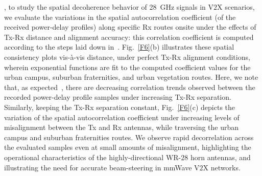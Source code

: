 \documentclass[10pt, twocolumn]{IEEEtran}
\begin{document}
, to study the spatial decoherence behavior of \SI{28}{\giga\hertz} signals in V$2$X scenarios, we evaluate the variations in the spatial autocorrelation coefficient (of the received power-delay profiles) along specific Rx routes onsite under the effects of Tx-Rx distance and alignment accuracy: this correlation coefficient is computed according to the steps laid down in~\cite{MacCartneySpatialStatistics}. Fig.~\ref{F6}(b) illustrates these spatial consistency plots vis-\`{a}-vis distance, under perfect Tx-Rx alignment conditions, wherein exponential functions are fit to the computed coefficient values for the urban campus, suburban fraternities, and urban vegetation routes. Here, we note that, as expected~\cite{MacCartneySpatialStatistics}, there are decreasing correlation trends observed between the recorded power-delay profile samples under increasing Tx-Rx separation. Similarly, keeping the Tx-Rx separation constant, Fig.~\ref{F6}(c) depicts the variation of the spatial autocorrelation coefficient under increasing levels of misalignment between the Tx and Rx antennas, while traversing the urban campus and suburban fraternities routes. We observe rapid decorrelation across the evaluated samples even at small amounts of misalignment, highlighting the operational characteristics of the highly-directional WR-$28$ horn antennas, and illustrating the need for accurate beam-steering in mmWave V$2$X networks.
\end{document}
